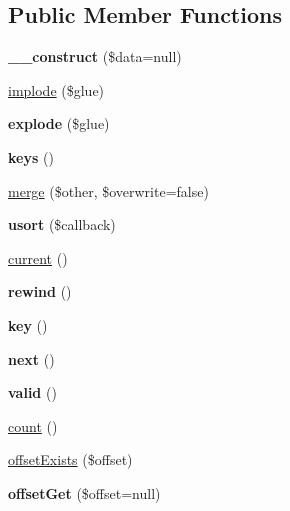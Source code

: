 \subsection*{Public Member Functions}
\begin{DoxyCompactItemize}
\item 
\hypertarget{classArrayList_a9d768c4cd89527c088c22f37682a3dd9}{
{\bfseries \_\-\_\-construct} (\$data=null)}
\label{classArrayList_a9d768c4cd89527c088c22f37682a3dd9}

\item 
\hyperlink{classArrayList_af3b2589a8217fd3940a2c5c02f013464}{implode} (\$glue)
\item 
\hypertarget{classArrayList_a431e2b6b4e80c2a394ed6650ca0cd704}{
{\bfseries explode} (\$glue)}
\label{classArrayList_a431e2b6b4e80c2a394ed6650ca0cd704}

\item 
\hypertarget{classArrayList_aab49ce13cee86e394f056cbb58a87c42}{
{\bfseries keys} ()}
\label{classArrayList_aab49ce13cee86e394f056cbb58a87c42}

\item 
\hyperlink{classArrayList_acfdc7b238672ea487ca21bd25725eef0}{merge} (\$other, \$overwrite=false)
\item 
\hypertarget{classArrayList_a0893e98494e2fa50e7e599e02702519e}{
{\bfseries usort} (\$callback)}
\label{classArrayList_a0893e98494e2fa50e7e599e02702519e}

\item 
\hyperlink{classArrayList_ad6b02815f556ca7a76494ed12b27aa96}{current} ()
\item 
\hypertarget{classArrayList_a87515f60ae4ebdd0539cfcadf2a5d0dc}{
{\bfseries rewind} ()}
\label{classArrayList_a87515f60ae4ebdd0539cfcadf2a5d0dc}

\item 
\hypertarget{classArrayList_ae2bb108208e1b5d29f93e0a7d8a21542}{
{\bfseries key} ()}
\label{classArrayList_ae2bb108208e1b5d29f93e0a7d8a21542}

\item 
\hypertarget{classArrayList_aa62b47db8550898b560734aca682d092}{
{\bfseries next} ()}
\label{classArrayList_aa62b47db8550898b560734aca682d092}

\item 
\hypertarget{classArrayList_a332cddf64ac35efc06c4c56593f38064}{
{\bfseries valid} ()}
\label{classArrayList_a332cddf64ac35efc06c4c56593f38064}

\item 
\hyperlink{classArrayList_a149d12c4042fe070f7579bce33eed2ce}{count} ()
\item 
\hyperlink{classArrayList_a18a60fa294bfba47839e27412f713ab6}{offsetExists} (\$offset)
\item 
\hypertarget{classArrayList_ae0353aa1d538eff8cfb70d0e41c3a1e5}{
{\bfseries offsetGet} (\$offset=null)}
\label{classArrayList_ae0353aa1d538eff8cfb70d0e41c3a1e5}


\end{DoxyCompactItemize}
